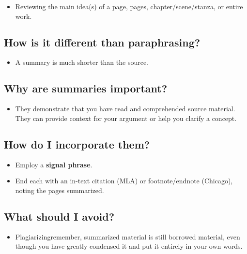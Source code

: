 \begin{itemize}

\item Reviewing the main idea(s) of a page, pages, chapter/scene/stanza, or entire 
work.

\end{itemize}
\subsection {How is it different than paraphrasing?}

\begin{itemize}
\item A summary is much shorter than the source.
\end{itemize}
\subsection {Why are summaries important?}

\begin{itemize}
\item They demonstrate that you have read and comprehended source material. They 
can provide context for your argument or help you clarify a concept.
\end{itemize}

\subsection{How do I incorporate them?}

\begin{itemize}
\item Employ a \textbf{signal phrase}.

\item End each with an in-text citation (MLA) or footnote/endnote (Chicago), noting 
the pages summarized.
\end{itemize}

\subsection{What should I avoid?}
\begin{itemize}

\item Plagiarizing\textemdash remember, summarized material is still borrowed material, even 
though you have greatly condensed it and put it entirely in your own words.
 \end{itemize}
 

